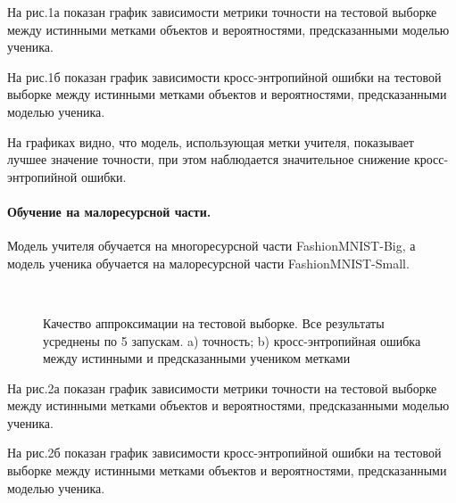 На рис.1а показан график зависимости метрики точности на тестовой выборке между истинными метками объектов и вероятностями, предсказанными моделью ученика.

На рис.1б показан график зависимости кросс-энтропийной ошибки на тестовой выборке между истинными метками объектов и вероятностями, предсказанными моделью ученика.

На графиках видно, что модель, использующая метки учителя, показывает лучшее значение точности, при этом наблюдается значительное снижение кросс-энтропийной ошибки.

\newpage
\paragraph{Обучение на малоресурсной части.}
Модель учителя обучается на многоресурсной части FashionMNIST-Big, а модель ученика обучается на малоресурсной части FashionMNIST-Small.

\begin{figure}[h!t]\center
{}
\\
\caption{Качество аппроксимации на тестовой выборке. Все результаты усреднены по 5 запускам. a) точность; b) кросс-энтропийная ошибка между истинными и предсказанными учеником метками}
\end{figure}

На рис.2а показан график зависимости метрики  точности на тестовой выборке между истинными метками объектов и вероятностями, предсказанными моделью ученика.

На рис.2б показан график зависимости кросс-энтропийной ошибки на тестовой выборке между истинными метками объектов и вероятностями, предсказанными моделью ученика.

